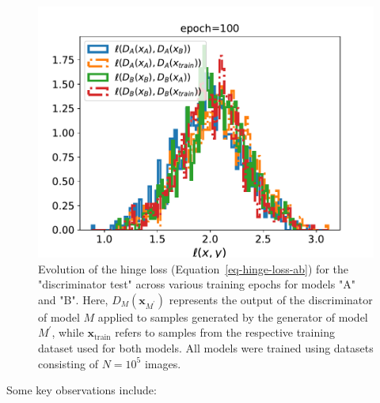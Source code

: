 \documentclass[fleqn,usenatbib]{mnras}
\begin{document}
\begin{figure}
    \includegraphics[width=0.8\linewidth]{fig-gan_loss_discri_A_B_num_100.pdf}
\caption{Evolution of the hinge loss (Equation~\ref{eq-hinge-loss-ab}) for the "discriminator test" across various training epochs for models "A" and "B". Here, \(D_M(\bm{x}_{M^\prime})\) represents the output of the discriminator of model \(M\) applied to samples generated by the generator of model \(M^\prime\), while \(\bm{x}_{\text{train}}\) refers to samples from the respective training dataset used for both models. All models were trained using datasets consisting of $N=10^5$ images.}
\label{fig-gan-hinge-loss-evol}
\end{figure}
Some key observations include:
\end{document}
